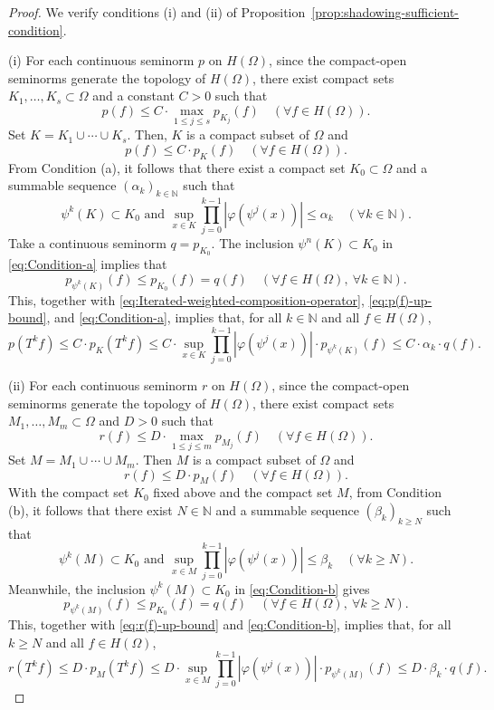 \documentclass[11pt]{amsart}
\theoremstyle{definition}
\theoremstyle{remark}
\theoremstyle{plain}
\begin{document}
\begin{proof}
We verify conditions (i) and (ii) of Proposition~\ref{prop:shadowing-sufficient-condition}.

\medskip

(i) For each continuous seminorm $p$ on \(H(\Omega)\), since the compact-open seminorms
generate the topology of \(H(\Omega)\), there exist compact sets
\(K_1,\ldots,K_s\subset\Omega\) and a constant \(C>0\) such that
\[
p(f)\le C\cdot \max_{1\le j\le s}p_{K_j}(f)
\quad(\forall f\in H(\Omega)).
\]
Set \(K=K_1\cup\cdots\cup K_s\).
Then, \(K\) is a compact subset of $\Omega$ and
\begin{equation}\label{eq:p(f)-up-bound}
p(f)\le C\cdot p_K(f)
\quad(\forall f\in H(\Omega)).
\end{equation}
From Condition (a), it follows that there exist a compact
set \(K_0\subset\Omega\) and a summable sequence
\((\alpha_k)_{k\in\mathbb{N}}\) such that
\begin{equation}\label{eq:Condition-a}
\psi^k(K)\subset K_0
\text{ and }
\sup_{x\in K}\prod_{j=0}^{k-1}|\varphi(\psi^j(x))|
\le \alpha_k \quad (\forall k\in \mathbb{N}).
\end{equation}
Take a continuous seminorm \(q=p_{K_0}.\)
The inclusion $\psi^n(K)\subset K_0$ in \eqref{eq:Condition-a}
implies that
\[
p_{\psi^k(K)}(f)\le p_{K_0}(f)=q(f)
\quad(\forall f\in H(\Omega),\ \forall k\in \mathbb{N}).
\]
This, together with \eqref{eq:Iterated-weighted-composition-operator},
\eqref{eq:p(f)-up-bound}, and \eqref{eq:Condition-a}, implies that,
for all \(k\in\mathbb{N}\) and all \(f\in H(\Omega)\),
\[
p(T^k f)
\le C\cdot p_{K}(T^k f)\leq
C\cdot \sup_{x\in K}\prod_{j=0}^{k-1}|\varphi(\psi^j(x))|
\cdot p_{\psi^k(K)}(f)
\le
C\cdot\alpha_k\cdot q(f).
\]

(ii) For each continuous seminorm \(r\) on \(H(\Omega)\), since the compact-open
seminorms generate the topology of \(H(\Omega)\), there exist compact sets
\(M_1,\ldots,M_m\subset\Omega\) and \(D>0\) such that
\[
r(f)\le D\cdot \max_{1\le j\le m}p_{M_j}(f)
\quad(\forall f\in H(\Omega)).
\]
Set \(M=M_1\cup\cdots\cup M_m\).  Then \(M\) is a compact subset of \(\Omega\)
and
\begin{equation}\label{eq:r(f)-up-bound}
r(f)\le D\cdot p_M(f)
\quad(\forall f\in H(\Omega)).
\end{equation}
With the compact set \(K_0\) fixed above and the compact
set $M$, from Condition (b), it follows that there exist
\(N\in\mathbb{N}\) and a summable sequence
\((\beta_k)_{k\ge N}\) such that
\begin{equation}\label{eq:Condition-b}
\psi^k(M)\subset K_0
\text{ and }
\sup_{x\in M}\prod_{j=0}^{k-1}|\varphi(\psi^j(x))|\le\beta_k
\quad (\forall k\ge N).
\end{equation}
Meanwhile, the inclusion
\(\psi^k(M)\subset K_0\) in \eqref{eq:Condition-b} gives
\[
p_{\psi^k(M)}(f)\le p_{K_0}(f)=q(f)
\quad(\forall f\in H(\Omega),\
\forall k\geq N).
\]
This, together with \eqref{eq:r(f)-up-bound} and \eqref{eq:Condition-b},
implies that,
for all \(k\geq N\) and all \(f\in H(\Omega)\),
\[
r(T^k f)
\le D\cdot p_{M}(T^k f)
\le
D\cdot \sup_{x\in M}\prod_{j=0}^{k-1}|\varphi(\psi^j(x))|\cdot p_{\psi^k(M)}(f)
\le
D\cdot \beta_k\cdot q(f).
\]


\end{proof}
\end{document}
